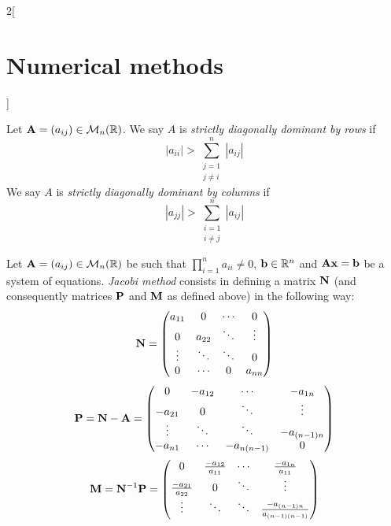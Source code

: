 \documentclass[../../../main.tex]{subfiles}
\begin{document}
\begin{multicols}{2}[\section{Numerical methods}]
\begin{proposition}
  \end{proposition}
  \begin{definition}
    Let $\boldsymbol{\mathrm{A}}=(a_{ij})\in\mathcal{M}_n(\mathbb{R})$. We say $A$ is \emph{strictly diagonally dominant by rows} if $$|a_{ii}|>\sum_{\substack{j=1\\j\ne i}}^n|a_{ij}|$$
    We say $A$ is \emph{strictly diagonally dominant by columns} if $$|a_{jj}|>\sum_{\substack{i=1\\i\ne j}}^n|a_{ij}|$$
  \end{definition}
  \begin{definition}
    Let $\boldsymbol{\mathrm{A}}=(a_{ij})\in\mathcal{M}_n(\mathbb{R})$ be such that $\prod_{i=1}^na_{ii}\ne 0$, $\boldsymbol{\mathrm{b}}\in\mathbb{R}^n$ and $\boldsymbol{\mathrm{A}}\boldsymbol{\mathrm{x}}=\boldsymbol{\mathrm{b}}$ be a system of equations. \emph{Jacobi method} consists in defining a matrix $\boldsymbol{\mathrm{N}}$ (and consequently matrices $\boldsymbol{\mathrm{P}}$ and $\boldsymbol{\mathrm{M}}$ as defined above) in the following way:
    \begin{equation*}
      \boldsymbol{\mathrm{N}}=
      \begin{pmatrix}
        a_{11} & 0      & \cdots & 0      \\
        0      & a_{22} & \ddots & \vdots \\
        \vdots & \ddots & \ddots & 0      \\
        0      & \cdots & 0      & a_{nn}
      \end{pmatrix}
    \end{equation*}
    \begin{equation*}
      \boldsymbol{\mathrm{P}}=\boldsymbol{\mathrm{N}}-\boldsymbol{\mathrm{A}}=
      \begin{pmatrix}
        0       & -a_{12} & \cdots      & -a_{1n}     \\
        -a_{21} & 0       & \ddots      & \vdots      \\
        \vdots  & \ddots  & \ddots      & -a_{(n-1)n} \\
        -a_{n1} & \cdots  & -a_{n(n-1)} & 0
      \end{pmatrix}
    \end{equation*}
    \begin{equation*}
      \boldsymbol{\mathrm{M}}=\boldsymbol{\mathrm{N}}^{-1}\boldsymbol{\mathrm{P}}=
      \begin{pmatrix}
        0                      & \frac{-a_{12}}{a_{11}} & \cdots                     & \frac{-a_{1n}}{a_{11}}             \\
        \frac{-a_{21}}{a_{22}} & 0                      & \ddots                     & \vdots                             \\
        \vdots                 & \ddots                 & \ddots                     & \frac{-a_{(n-1)n}}{a_{(n-1)(n-1)}} \\

\end{pmatrix}
\end{equation*}
\end{definition}
\end{multicols}
\end{document}
